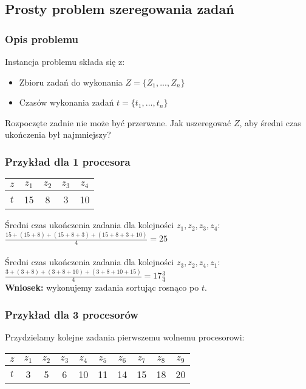 \subsection{Prosty problem szeregowania zadań}
\subsubsection{Opis problemu}
Instancja problemu składa się z:
\begin{itemize}
	\item Zbioru zadań do wykonania $Z= \{ Z_1,...,Z_n \}$
    \item Czasów wykonania zadań $t = \{ t_1,...,t_n\}$
\end{itemize}
Rozpoczęte zadnie nie może być przerwane.
Jak uszeregować $Z$, aby średni czas ukończenia był najmniejszy?

\subsubsection{Przykład dla 1 procesora}
\begin{center}
\begin{tabular}{ c | c | c | c | c }
  $z$ & $z_1$	& $z_2$ & $z_3$ & $z_4$ \\ \hline
  $t$ & 15 		&  8 	& 3 	& 10 \\ 
\end{tabular}
\end{center}
Średni czas ukończenia zadania dla kolejności $z_1, z_2, z_3, z_4$:
$\frac{15+(15+8)+(15+8+3)+(15+8+3+10)}{4}= 25$ \\
\\
Średni czas ukończenia zadania dla kolejności $z_3, z_2, z_4, z_1$:
$\frac{3+(3+8)+(3+8+10)+(3+8+10+15)}{4} = 17\frac{3}{4}$ \\

\textbf{Wniosek:} wykonujemy zadania sortując rosnąco po $t$.

\subsubsection{Przykład dla 3 procesorów}
Przydzielamy kolejne zadania pierwszemu wolnemu procesorowi:
\begin{center}
\begin{tabular}{ c | c | c | c | c | c | c | c | c | c } 
  $z$ 	& $z_1$	& $z_2$ & $z_3$ & $z_4$	& $z_5$	& $z_6$ & $z_7$ & $z_8$	& $z_9$ \\ \hline
  $t$ 	& 3		& 5		& 6		& 10	& 11	& 14	& 15	& 18	& 20 \\ 
\end{tabular}
\end{center}

